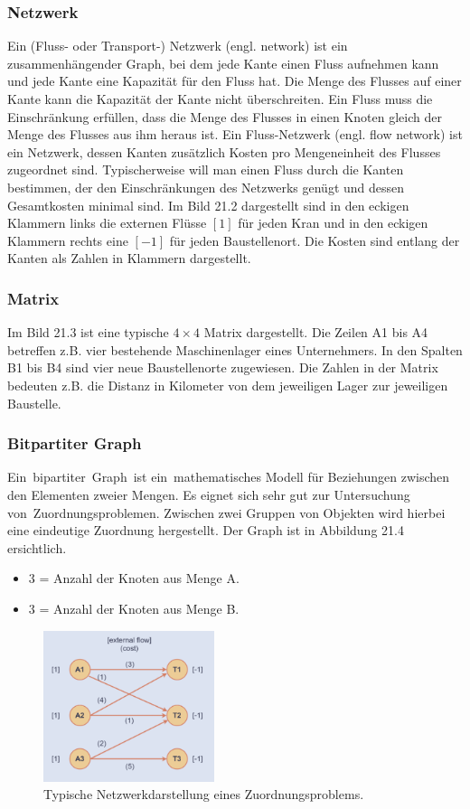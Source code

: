 \subsubsection{Netzwerk}
Ein (Fluss- oder Transport-) Netzwerk (engl. network) ist ein zusammenhängender Graph, bei dem jede Kante einen Fluss aufnehmen kann und jede Kante eine Kapazität für den Fluss hat. Die Menge des Flusses auf einer Kante kann die Kapazität der Kante nicht überschreiten. Ein Fluss muss die Einschränkung erfüllen, dass die Menge des Flusses in einen Knoten gleich der Menge des Flusses aus ihm heraus ist. Ein Fluss-Netzwerk (engl. flow network) ist ein Netzwerk, dessen Kanten zusätzlich Kosten pro Mengeneinheit des Flusses zugeordnet sind. Typischerweise will man einen Fluss durch die Kanten bestimmen, der den Einschränkungen des Netzwerks genügt und dessen Gesamtkosten minimal sind. Im Bild 21.2 dargestellt sind in den eckigen Klammern links die externen Flüsse $[1]$ für jeden Kran und in den eckigen Klammern rechts eine $[-1]$ für jeden Baustellenort. Die Kosten sind entlang der Kanten als Zahlen in Klammern dargestellt.  
\subsubsection{Matrix}
Im Bild 21.3 ist eine typische $4\times 4$ Matrix dargestellt. Die Zeilen A1 bis A4 betreffen z.B. vier bestehende Maschinenlager eines Unternehmers. In den Spalten B1 bis B4 sind vier neue Baustellenorte zugewiesen. Die Zahlen in der Matrix bedeuten z.B. die Distanz in Kilometer von dem jeweiligen Lager zur jeweiligen Baustelle.
\subsubsection{Bitpartiter Graph}
Ein bipartiter Graph ist ein mathematisches Modell für Beziehungen
zwischen den Elementen zweier Mengen. Es eignet sich sehr gut zur Untersuchung von Zuordnungsproblemen. Zwischen zwei Gruppen von Objekten wird hierbei eine eindeutige Zuordnung hergestellt. Der Graph ist in Abbildung 21.4 ersichtlich.
\begin{itemize}
\item 3 = Anzahl der Knoten aus Menge A.
\item 3 = Anzahl der Knoten aus Menge B.
\end{itemize}


\begin{figure}
\centering
\includegraphics[width=5cm]{papers/munkres/figures/Netzwerkdarstellung}
\caption{Typische Netzwerkdarstellung eines Zuordnungsproblems.}
\label{munkres:Vr2}
\end{figure}

